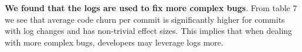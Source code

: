 \textbf{We found that the logs are used to fix more complex bugs}. From table 7 we see that average code churn per commit is significantly higher for commits with log changes and has non-trivial effect sizes. This implies that when dealing with more complex bugs, developers may leverage logs more.

 
 



%
%
%

